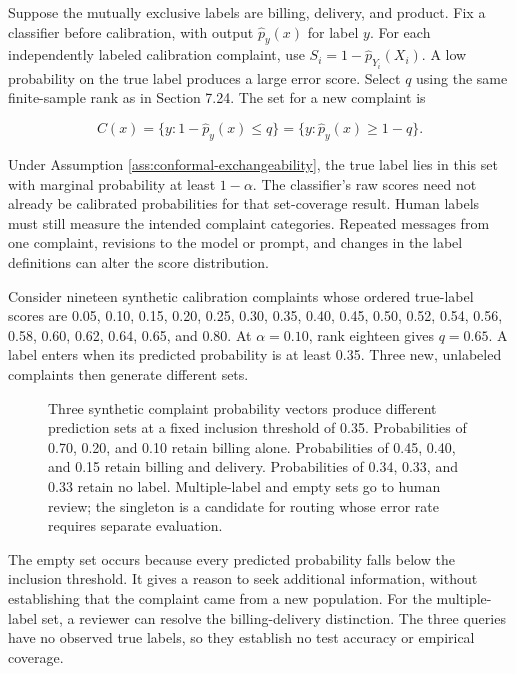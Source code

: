 Suppose the mutually exclusive labels are billing, delivery, and
product. Fix a classifier before calibration, with output
\(\widehat p_y(x)\) for label \(y\). For each independently labeled
calibration complaint, use \(S_i=1-\widehat p_{Y_i}(X_i)\). A low
probability on the true label produces a large error score. Select \(q\)
using the same finite-sample rank as in Section 7.24. The set for a new
complaint is

\[
C(x)=\{y:1-\widehat p_y(x)\leq q\}
     =\{y:\widehat p_y(x)\geq1-q\}.
\]

Under Assumption \ref{ass:conformal-exchangeability}, the true label
lies in this set with marginal probability at least \(1-\alpha\). The
classifier's raw scores need not already be calibrated probabilities for
that set-coverage result. Human labels must still measure the intended
complaint categories. Repeated messages from one complaint, revisions to
the model or prompt, and changes in the label definitions can alter the
score distribution.

Consider nineteen synthetic calibration complaints whose ordered
true-label scores are 0.05, 0.10, 0.15, 0.20, 0.25, 0.30, 0.35, 0.40,
0.45, 0.50, 0.52, 0.54, 0.56, 0.58, 0.60, 0.62, 0.64, 0.65, and 0.80. At
\(\alpha=0.10\), rank eighteen gives \(q=0.65\). A label enters when its
predicted probability is at least 0.35. Three new, unlabeled complaints
then generate different sets.

\begin{figure}[htbp]
\centering

\caption{Three synthetic complaint probability vectors produce different prediction sets at a fixed inclusion threshold of 0.35. Probabilities of 0.70, 0.20, and 0.10 retain billing alone. Probabilities of 0.45, 0.40, and 0.15 retain billing and delivery. Probabilities of 0.34, 0.33, and 0.33 retain no label. Multiple-label and empty sets go to human review; the singleton is a candidate for routing whose error rate requires separate evaluation.}\label{fig:M07_conformal_sets}
\end{figure}

The empty set occurs because every predicted probability falls below the
inclusion threshold. It gives a reason to seek additional information,
without establishing that the complaint came from a new population. For
the multiple-label set, a reviewer can resolve the billing-delivery
distinction. The three queries have no observed true labels, so they
establish no test accuracy or empirical coverage.


